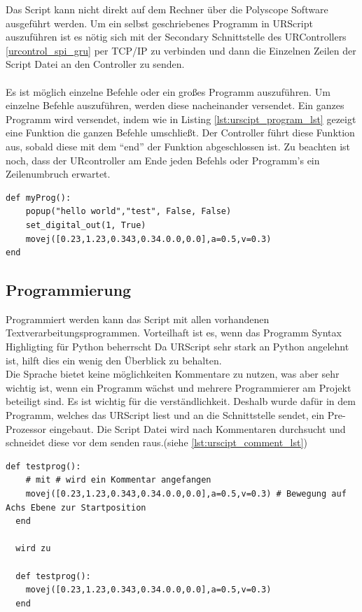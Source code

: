 Das Script kann nicht direkt auf dem Rechner über die Polyscope Software ausgeführt werden. Um ein selbst geschriebenes Programm in URScript auszuführen ist es nötig sich mit der Secondary Schnittstelle des URControllers \ref{urcontrol_spi_gru} per \ac{TCP/IP} zu verbinden und dann die Einzelnen Zeilen der Script Datei an den Controller zu senden.
\\\\
Es ist möglich einzelne Befehle oder ein großes Programm auszuführen. Um einzelne Befehle auszuführen, werden diese nacheinander versendet.
Ein ganzes Programm wird versendet, indem wie in Listing \ref{lst:urscipt_program_lst} gezeigt eine Funktion die ganzen Befehle umschließt. Der Controller führt diese Funktion aus, sobald diese mit dem ``end'' der Funktion abgeschlossen ist.
Zu beachten ist noch, dass der URcontroller am Ende jeden Befehls oder Programm's ein Zeilenumbruch erwartet.

\begin{lstlisting}[caption={Kleines Beispielprogramm in URScript}, label=lst:urscipt_program_lst ,captionpos=b] 
def myProg():
	popup("hello world","test", False, False)
	set_digital_out(1, True)
	movej([0.23,1.23,0.343,0.34.0.0,0.0],a=0.5,v=0.3)
end
\end{lstlisting}

\subsection{Programmierung}
\label{programmierung_ur_script_rel}

Programmiert werden kann das Script mit allen vorhandenen Textverarbeitungsprogrammen. Vorteilhaft ist es, wenn das Programm \acs{Syntax Highligting} für Python beherrscht Da URScript sehr stark an Python angelehnt ist, hilft dies ein wenig den Überblick zu behalten.
\\Die Sprache bietet keine möglichkeiten Kommentare zu nutzen, was aber sehr wichtig ist, wenn ein Programm wächst und mehrere Programmierer am Projekt beteiligt sind. Es ist wichtig für die verständlichkeit. Deshalb wurde dafür in dem Programm, welches das URScript liest und an die Schnittstelle sendet, ein Pre-Prozessor eingebaut. Die Script Datei wird nach Kommentaren durchsucht und schneidet diese vor dem senden raus.(siehe \ref{lst:urscipt_comment_lst})

\begin{lstlisting}[caption={Beispiel-Kommentare vor und nach dem Pre-Prozessor}, label=lst:urscipt_comment_lst ,captionpos=b]
  def testprog():
    # mit # wird ein Kommentar angefangen
    movej([0.23,1.23,0.343,0.34.0.0,0.0],a=0.5,v=0.3) # Bewegung auf Achs Ebene zur Startposition
  end

  wird zu 

  def testprog():
    movej([0.23,1.23,0.343,0.34.0.0,0.0],a=0.5,v=0.3)
  end

\end{lstlisting}

